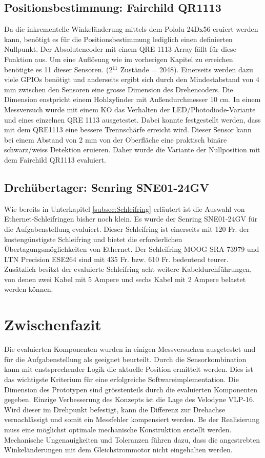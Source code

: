 \subsection{Positionsbestimmung: Fairchild QR1113}
\label{subsec:QR1113}
Da die inkrementelle Winkeländerung mittels dem Pololu 24Dx56 eruiert werden kann, benötigt es für die Positionsbestimmung lediglich einen definierten Nullpunkt. Der Absolutencoder mit einem QRE 1113 Array fällt für diese Funktion aus. Um eine Auflösung wie im vorherigen Kapitel zu erreichen benötigte es 11 dieser Sensoren. (2$^{11}$ Zustände = 2048). Einerseits werden dazu viele GPIOs benötigt und anderseits ergibt sich durch den Mindestabstand von 4 mm zwischen den Sensoren eine grosse Dimension des Drehencoders. Die Dimension enstpricht einem Hohlzylinder mit Außendurchmesser 10 cm.
In einem Messversuch wurde mit einem \ac{KO} das Verhalten der LED/Photodiode-Variante und eines einzelnen QRE 1113 ausgetestet. Dabei konnte festgestellt werden, dass mit dem QRE1113 eine bessere Trennschärfe erreicht wird. Dieser Sensor kann bei einem Abstand von 2 mm von der Oberfläche eine praktisch binäre schwarz/weiss Detektion eruieren. Daher wurde die Variante der Nullposition mit dem Fairchild QR1113 evaluiert.

\subsection{Drehübertager: Senring SNE01-24GV}
\label{subsec:SNE01}
Wie bereits in Unterkapitel \ref{subsec:Schleifring} erläutert ist die Auswahl von Ethernet-Schleifringen bisher noch klein. Es wurde der Senring SNE01-24GV für die Aufgabenstellung evaluiert. Dieser Schleifring ist einerseits mit 120 Fr. der kostengünstigste Schleifring und bietet die erforderlichen Übertagungsmöglichkeiten von Ethernet. Der Schleifring MOOG SRA-73979 und LTN Precision ESE264 sind mit 435 Fr. bzw. 610 Fr. bedeutend teurer. Zusätzlich besitzt der evaluierte Schleifring acht weitere Kabeldurchführungen, von denen zwei Kabel mit 5 Ampere und sechs Kabel mit 2 Ampere belastet werden können.\cite{senring}

\section{Zwischenfazit}
\label{ZwischenfazitKonz}
Die evaluierten Komponenten wurden in einigen Messversuchen ausgetestet und für die Aufgabenstellung als geeignet beurteilt. Durch die Sensorkombination kann mit enstsprechender Logik die aktuelle Position ermittelt werden. Dies ist das wichtigste Kriterium für eine erfolgreiche Softwareimplementation. Die Dimension des Prototypen sind grösstenteils durch die evaluierten Komponenten gegeben. Einzige Verbesserung des Konzepts ist die Lage des Velodyne VLP-16. Wird dieser im Drehpunkt befestigt, kann die Differenz zur Drehachse vernachlässigt und somit ein Messfehler kompensiert werden. Be der Realisierung muss eine möglichst optimale mechanische Konstruktion erstellt werden. Mechanische Ungenauigkeiten und Toleranzen führen dazu, dass die angestrebten Winkeländerungen mit dem Gleichstrommotor nicht eingehalten werden.



